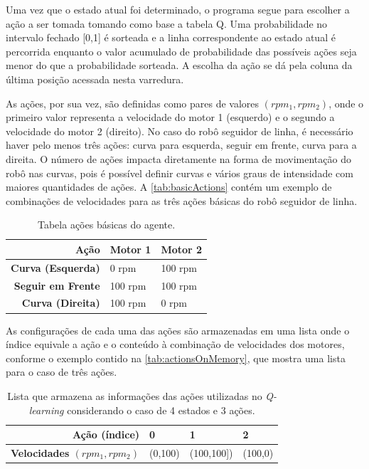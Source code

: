 \documentclass[a4paper]{ifacconf}
\begin{document}
Uma vez que o estado atual foi determinado, o programa segue para escolher a ação a ser tomada tomando como base a tabela Q. Uma probabilidade no intervalo fechado [0,1] é sorteada e a linha correspondente ao estado atual é percorrida enquanto o valor acumulado de probabilidade das possíveis ações seja menor do que a probabilidade sorteada. A escolha da ação se dá pela coluna da última posição acessada nesta varredura.

As ações, por sua vez, são definidas como pares de valores ${(rpm_1,rpm_2)}$, onde o primeiro valor representa a velocidade do motor 1 (esquerdo) e o segundo a velocidade do motor 2 (direito). No caso do robô seguidor de linha, é necessário haver pelo menos três ações: curva para esquerda, seguir em frente, curva para a direita. O número de ações impacta diretamente na forma de movimentação do robô nas curvas, pois é possível definir curvas e vários graus de intensidade com maiores quantidades de ações. A \autoref{tab:basicActions} contém um exemplo de combinações de velocidades para as três ações básicas do robô seguidor de linha.

\begin{table}
\centering
\ABNTEXfontereduzida
\caption{Tabela ações básicas do agente.} \label{tab:basicActions}
\begin{tabular}{r|p{1.8cm}|p{1.8cm}}
\textbf{Ação} & Motor 1 & Motor 2\\ \hline
\textbf{Curva (Esquerda)} & 0 rpm & 100 rpm\\
\textbf{Seguir em Frente} & 100 rpm & 100 rpm\\
\textbf{Curva (Direita)} & 100 rpm & 0 rpm\\
\end{tabular}
\end{table}

As configurações de cada uma das ações são armazenadas em uma lista onde o índice equivale a ação e o conteúdo à combinação de velocidades dos motores, conforme o exemplo contido na \autoref{tab:actionsOnMemory}, que mostra uma lista para o caso de três ações.

\begin{table}
\centering
\ABNTEXfontereduzida
\caption{Lista que armazena as informações das ações utilizadas no \textit{Q-learning} considerando o caso de 4 estados e 3 ações.} \label{tab:actionsOnMemory}
\begin{tabular}{r|p{2cm}|p{2cm}|p{2cm}}
\textbf{Ação (índice)} & 0 & 1 & 2\\ \hline
\textbf{Velocidades $(rpm_1,rpm_2)$} & (0,100) & (100,100]) & (100,0)\\
\end{tabular}
\end{table}
\end{document}

